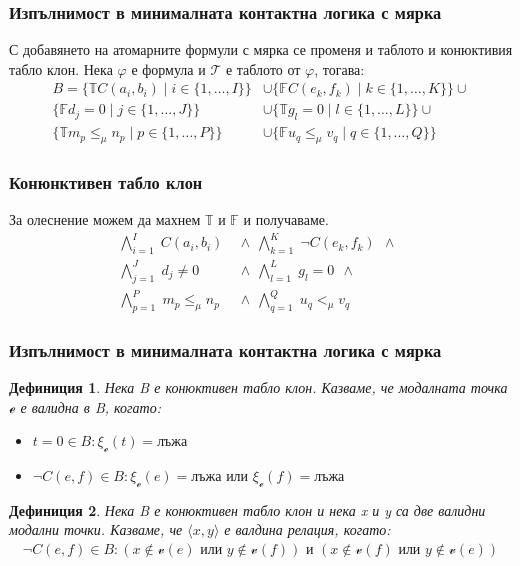 \documentclass{beamer}
\newtheorem{defn}{Дефиниция}[section]
\newcommand{\curvedE}{\mathscr{e}}
\newcommand{\vE}{\mathscr{v}}
\newcommand{\vBool}{\xi}
\newcommand{\signT}{\mathbb{T}}
\newcommand{\signF}{\mathbb{F}}
\begin{document}
\begin{frame}\frametitle{Изпълнимост в минималната контактна логика с мярка}
С добавянето на атомарните формули с мярка се променя и таблото и конюктивия табло клон.
Нека $\varphi$ е формула и $\mathcal{T}$ е таблото от $\varphi$, тогава:
		\begin{align*}
				B = \{\signT C(a_i, b_i) \mid i \in \{1, \ldots, I\} \} &\cup 
					\{\signF C(e_k, f_k) \mid k \in \{1, \ldots, K\} \} \cup \\
					\{\signF d_j = 0 \mid j \in \{1, \ldots, J\} \} &\cup 
					\{\signT g_l = 0 \mid l \in \{1, \ldots, L\} \} \cup \\
					\{\signT m_p \le_\mu n_p \mid p \in \{1, \ldots, P\} \} &\cup
					\{\signF u_q \le_\mu v_q \mid q \in \{1, \ldots, Q\} \}
		\end{align*}
\end{frame}

\begin{frame}\frametitle{Конюнктивен табло клон}
		За олеснение можем да махнем $\signT \textit{ и } \signF$ и получаваме.
\begin{align*}
			\bigwedge_{i=1}^{I} \; C(a_i, b_i) \:\: & \wedge \:\: 
			\bigwedge_{k=1}^{K} \; \neg C(e_k, f_k) \:\: \wedge \:\: \\
			\bigwedge_{j=1}^{J} \; d_j \neq 0 \:\: & \wedge \:\:
			\bigwedge_{l=1}^{L} \; g_l = 0 \:\: \wedge \:\:\\
			\bigwedge_{p=1}^{P} \; m_p \le_\mu n_p \:\: &\wedge \:\:
			\bigwedge_{q=1}^{Q} \; u_q <_\mu v_q \:\:
\end{align*}%
\end{frame}

\begin{frame}\frametitle{Изпълнимост в минималната контактна логика с мярка}
	\begin{defn}%
	Нека B е конюктивен табло клон. Казваме, че модалната точка $\curvedE$ е валидна в B, когато:
	\begin{itemize}
		\item $t = 0 \in B:  \vBool_{\curvedE}(t) = \textbf{лъжа}$
		\item $\neg C(e, f) \in B: \vBool_{\curvedE}(e) = \textbf{лъжа} \textit{ или } \vBool_{\curvedE}(f) = \textbf{лъжа}$
	\end{itemize}
	\end{defn}

	\begin{defn}
		Нека B е конюктивен табло клон и нека x и y са две валидни модални точки. Казваме, че $\langle x, y \rangle$ е валдина релация, когато:
		\begin{align*}
				\neg C(e, f) \in B: (x \notin \vE(e) \textit{ или } y \notin \vE(f)) \textit{ и } (x \notin \vE(f) \textit{ или } y \notin \vE(e))
		\end{align*}
	\end{defn}
\end{frame}
\end{document}
